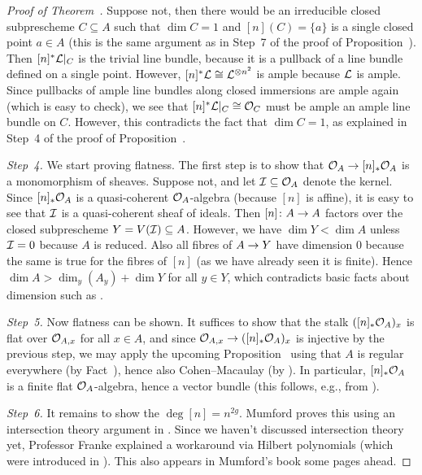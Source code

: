 \documentclass[a4paper,parskip=half,numbers=enddot, DIV=12]{scrreprt}
\begin{document}
\begin{proof}[Proof of Theorem~]
	Suppose not, then there would be an irreducible closed subprescheme $C\subseteq A$  such that $\dim C=1$ and $[n](C)=\{a\}$ is a single closed point $a\in A$ (this is the same argument as in Step~7 of the proof of Proposition~). Then $[n]^*\mathcal{L}|_C$ is the trivial line bundle, because it is a pullback of a line bundle defined on a single point. However, $[n]^*\mathcal{L}\cong \mathcal{L}^{\otimes n^2}$ is ample because $\mathcal{L}$ is ample. Since pullbacks of ample line bundles along closed immersions are ample again (which is easy to check), we see that $[n]^*\mathcal{L}|_C\cong \mathcal{O}_C$ must be ample an ample line bundle on $C$. However, this contradicts the fact that $\dim C=1$, as explained in Step~4 of the proof of Proposition~.
	
	\emph{Step~4.} We start proving flatness. The first step is to show that $\Oo_A\morphism[] [n]_*\Oo_A$ is a monomorphism of sheaves. Suppose not, and let $\mathcal{I}\subseteq \mathcal{O}_A$ denote the kernel. Since $[n]_*\mathcal{O}_A$ is a quasi-coherent $\mathcal{O}_A$-algebra (because $[n]$ is affine), it is easy to see that $\mathcal{I}$ is a quasi-coherent sheaf of ideals. Then $[n]\colon A\morphism A$ factors over the closed subprescheme $Y=V(\mathcal{I})\subseteq A$. However, we have $\dim Y<\dim A$ unless $\mathcal{I}=0$ because $A$ is reduced. Also all fibres of $A\morphism Y$ have dimension $0$ because the same is true for the fibres of $[n]$ (as we have already seen it is finite). Hence $\dim A>\dim_y(A_y)+\dim Y$ for all $y\in Y$, which contradicts basic facts about dimension such as \cite[]{stacks-project}.
	
	\emph{Step~5.} Now flatness can be shown. It suffices to show that the stalk $([n]_*\mathcal{O}_A)_x$ is flat over $\mathcal{O}_{A,x}$ for all $x\in A$, and since $\Oo_{A,x}\morphism ([n]_*\Oo_A)_x$ is injective by the previous step, we may apply the upcoming Proposition~ using that $A$ is regular everywhere (by Fact~), hence also Cohen--Macaulay (by \cite[Example~2.4.1]{homalg}). In particular, $[n]_*\mathcal{O}_A$ is a finite flat $\mathcal{O}_A$-algebra, hence a vector bundle (this follows, e.g., from \cite[Proposition~1.3.2]{homalg}).
	
	\emph{Step~6.} It remains to show the $\deg{[n]}=n^{2g}$. Mumford proves this using an intersection theory argument in \cite[63]{mumford1974abelian}. Since we haven't discussed intersection theory yet, Professor Franke explained a workaround via Hilbert polynomials (which were introduced in \cite[Section~3.1]{alg2}). This also appears in Mumford's book some pages ahead.
	

\end{proof}
\end{document}
